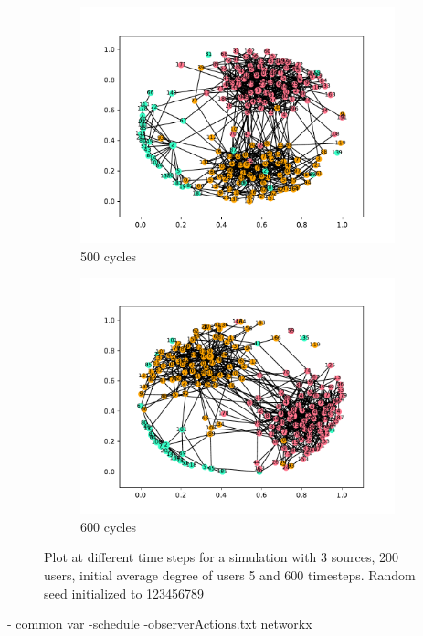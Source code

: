 \begin{figure}
  \begin{subfigure}[t]{.45\textwidth}
    \centering
    \includegraphics[trim={1cm .5cm 1cm 1cm}, clip, width=\linewidth]{img/pdf/plot-0500.pdf} 
    \caption{500 cycles} \label{fig:500}
  \end{subfigure}
  \begin{subfigure}[t]{.45\textwidth}
    \centering
    \includegraphics[trim={1cm .5cm 1cm 1cm}, clip, width=\linewidth]{img/pdf/plot-0600.pdf} 
    \caption{600 cycles} \label{fig:600}
  \end{subfigure}
  
  \caption{Plot at different time steps for a simulation with 3 sources, 200 users, initial average degree of users 5 and 600 timesteps. Random seed initialized to 123456789}
\end{figure}

- common var
-schedule
-observerActions.txt
networkx
